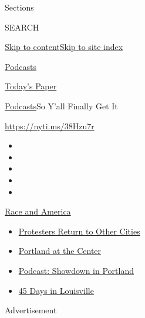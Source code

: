 Sections

SEARCH

\protect\hyperlink{site-content}{Skip to
content}\protect\hyperlink{site-index}{Skip to site index}

\href{https://www.nytimes.com/spotlight/podcasts}{Podcasts}

\href{https://myaccount.nytimes.com/auth/login?response_type=cookie\&client_id=vi}{}

\href{https://www.nytimes.com/section/todayspaper}{Today's Paper}

\href{/spotlight/podcasts}{Podcasts}\textbar{}So Y'all Finally Get It

\url{https://nyti.ms/38Hzu7r}

\begin{itemize}
\item
\item
\item
\item
\item
\end{itemize}

\href{https://www.nytimes.com/news-event/george-floyd-protests-minneapolis-new-york-los-angeles?action=click\&pgtype=Article\&state=default\&region=TOP_BANNER\&context=storylines_menu}{Race
and America}

\begin{itemize}
\tightlist
\item
  \href{https://www.nytimes.com/2020/07/26/us/protests-portland-seattle-trump.html?action=click\&pgtype=Article\&state=default\&region=TOP_BANNER\&context=storylines_menu}{Protesters
  Return to Other Cities}
\item
  \href{https://www.nytimes.com/2020/07/24/us/portland-oregon-protests-white-race.html?action=click\&pgtype=Article\&state=default\&region=TOP_BANNER\&context=storylines_menu}{Portland
  at the Center}
\item
  \href{https://www.nytimes.com/2020/07/23/podcasts/the-daily/portland-protests.html?action=click\&pgtype=Article\&state=default\&region=TOP_BANNER\&context=storylines_menu}{Podcast:
  Showdown in Portland}
\item
  \href{https://www.nytimes.com/interactive/2020/07/16/us/black-lives-matter-protests-louisville-breonna-taylor.html?action=click\&pgtype=Article\&state=default\&region=TOP_BANNER\&context=storylines_menu}{45
  Days in Louisville}
\end{itemize}

Advertisement

